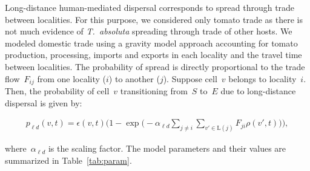\documentclass[11pt]{article}
\newcommand{\tuta}{\emph{T.~absoluta}}
\newcommand{\infest}{\rho}
\newcommand{\suitable}{\epsilon}
\newcommand{\pld}{p_{\ell d}}
\newcommand{\ald}{\alpha_{\ell d}}
\newcommand{\locality}{\mathrm{L}}
\theoremstyle{definition}
\begin{document}
Long-distance human-mediated dispersal corresponds to spread through trade
between localities. For this purpose, we considered only tomato trade as
there is not much evidence of \tuta{} spreading through trade of other
hosts. We modeled domestic trade using a gravity model approach accounting
for tomato production, processing, imports and exports in each locality and
the travel time between localities. 
The probability of spread is directly proportional to the trade
flow~$F_{ij}$ from one locality ($i$) to another ($j$).
Suppose cell~$v$ belongs to locality~$i$. Then, the probability of cell~$v$
transitioning from~$S$ to~$E$ due to long-distance dispersal is given by:
\begin{linenomath}
\begin{align}\label{eqn:pld}
    \pld(v,t)=\suitable(v,t)\bigg(1-
    \exp\Big(-\ald\sum_{j\ne i}\sum_{v'\in\locality(j)}F_{ji}\infest(v',t)\Big)\bigg),
\end{align}
\end{linenomath}
where~$\ald$ is the scaling factor.
The model parameters and their values are summarized in
Table~\ref{tab:param}. 
\end{document}
